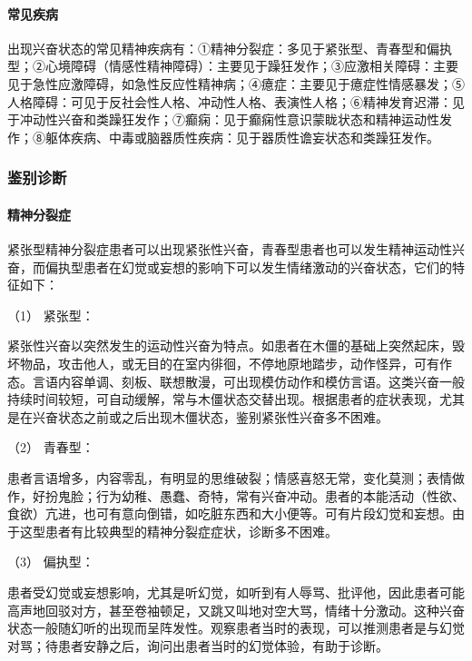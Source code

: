 \paragraph{常见疾病}

出现兴奋状态的常见精神疾病有：①精神分裂症：多见于紧张型、青春型和偏执型；②心境障碍（情感性精神障碍）：主要见于躁狂发作；③应激相关障碍：主要见于急性应激障碍，如急性反应性精神病；④癔症：主要见于癔症性情感暴发；⑤人格障碍：可见于反社会性人格、冲动性人格、表演性人格；⑥精神发育迟滞：见于冲动性兴奋和类躁狂发作；⑦癫痫：见于癫痫性意识蒙眬状态和精神运动性发作；⑧躯体疾病、中毒或脑器质性疾病：见于器质性谵妄状态和类躁狂发作。

\subsubsection{鉴别诊断}

\paragraph{精神分裂症}

紧张型精神分裂症患者可以出现紧张性兴奋，青春型患者也可以发生精神运动性兴奋，而偏执型患者在幻觉或妄想的影响下可以发生情绪激动的兴奋状态，它们的特征如下：

\hypertarget{text00043.htmlux5cux23CHP1-18-1-2-1-1}{}
（1） 紧张型：

紧张性兴奋以突然发生的运动性兴奋为特点。如患者在木僵的基础上突然起床，毁坏物品，攻击他人，或无目的在室内徘徊，不停地原地踏步，动作怪异，可有作态。言语内容单调、刻板、联想散漫，可出现模仿动作和模仿言语。这类兴奋一般持续时间较短，可自动缓解，常与木僵状态交替出现。根据患者的症状表现，尤其是在兴奋状态之前或之后出现木僵状态，鉴别紧张性兴奋多不困难。

\hypertarget{text00043.htmlux5cux23CHP1-18-1-2-1-2}{}
（2） 青春型：

患者言语增多，内容零乱，有明显的思维破裂；情感喜怒无常，变化莫测；表情做作，好扮鬼脸；行为幼稚、愚蠢、奇特，常有兴奋冲动。患者的本能活动（性欲、食欲）亢进，也可有意向倒错，如吃脏东西和大小便等。可有片段幻觉和妄想。由于这型患者有比较典型的精神分裂症症状，诊断多不困难。

\hypertarget{text00043.htmlux5cux23CHP1-18-1-2-1-3}{}
（3） 偏执型：

患者受幻觉或妄想影响，尤其是听幻觉，如听到有人辱骂、批评他，因此患者可能高声地回驳对方，甚至卷袖顿足，又跳又叫地对空大骂，情绪十分激动。这种兴奋状态一般随幻听的出现而呈阵发性。观察患者当时的表现，可以推测患者是与幻觉对骂；待患者安静之后，询问出患者当时的幻觉体验，有助于诊断。

